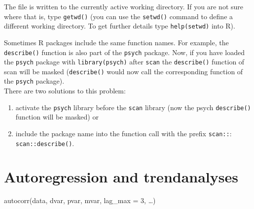 \documentclass[
  letterpaper,
  DIV=11,
  numbers=noendperiod]{scrreprt}
\providecommand{\tightlist}{%
  \setlength{\itemsep}{0pt}\setlength{\parskip}{0pt}}\usepackage{longtable,booktabs,array}
\begin{document}
The file is written to the currently active working directory. If you
are not sure where that is, type \texttt{getwd()} (you can use the
\texttt{setwd()} command to define a different working directory. To get
further details type \texttt{help(setwd)} into R).

\begin{tcolorbox}[enhanced jigsaw, opacitybacktitle=0.6, breakable, bottomrule=.15mm, coltitle=black, colbacktitle=quarto-callout-note-color!10!white, colframe=quarto-callout-note-color-frame, left=2mm, colback=white, titlerule=0mm, leftrule=.75mm, opacityback=0, toptitle=1mm, title=\textcolor{quarto-callout-note-color}{\faInfo}\hspace{0.5em}{Conflicting function names}, arc=.35mm, rightrule=.15mm, toprule=.15mm, bottomtitle=1mm]

Sometimes R packages include the same function names. For example, the
\texttt{describe()} function is also part of the \texttt{psych} package.
Now, if you have loaded the \texttt{psych} package with
\texttt{library(psych)} after \texttt{scan} the \texttt{describe()}
function of scan will be masked (\texttt{describe()} would now call the
corresponding function of the \texttt{psych} package).\\
There are two solutions to this problem:

\begin{enumerate}
\def\labelenumi{\arabic{enumi}.}
\tightlist
\item
  activate the \texttt{psych} library before the \texttt{scan} library
  (now the psych \texttt{describe()} function will be masked) or
\item
  include the package name into the function call with the prefix
  \texttt{scan::}: \texttt{scan::describe()}.
\end{enumerate}

\end{tcolorbox}

\hypertarget{autoregression-and-trendanalyses}{%
\section{Autoregression and
trendanalyses}\label{autoregression-and-trendanalyses}}

\begin{tcolorbox}[enhanced jigsaw, toprule=.15mm, colframe=quarto-callout-tip-color-frame, left=2mm, colback=white, breakable, bottomrule=.15mm, arc=.35mm, rightrule=.15mm, leftrule=.75mm, opacityback=0]
\begin{minipage}[t]{5.5mm}
\textcolor{quarto-callout-tip-color}{\faLightbulb}
\end{minipage}%
\begin{minipage}[t]{\textwidth - 5.5mm}
autocorr(data, dvar, pvar, mvar, lag\_max = 3, \ldots)\end{minipage}%
\end{tcolorbox}
\end{document}
